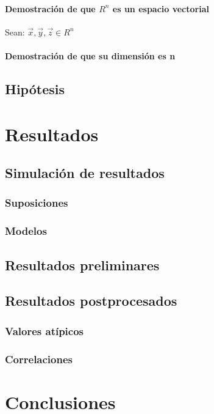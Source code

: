 \documentclass{book}
\begin{document}
\subsubsection{Demostración de que $R^n$ es un espacio vectorial}
Sean: $\overrightarrow{x},\overrightarrow{y},\overrightarrow{z}\in R^n$
\subsubsection{Demostración de que su dimensión es n}
\section{Hipótesis}
\chapter{Resultados}
\section{Simulación de resultados}
\subsection{Suposiciones}
\subsection{Modelos}
\section{Resultados preliminares}
\section{Resultados postprocesados}
\subsection{Valores atípicos}
\subsection{Correlaciones}
\chapter{Conclusiones}
\end{document}
